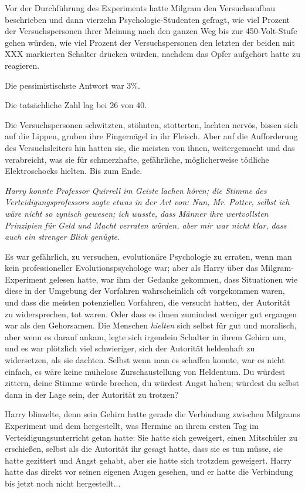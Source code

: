 {Vor der Durchführung des Experiments hatte Milgram den Versuchsaufbau beschrieben und dann vierzehn Psychologie-Studenten gefragt, wie viel Prozent der Versuchspersonen ihrer Meinung nach den ganzen Weg bis zur 450-Volt-Stufe gehen würden, wie viel Prozent der Versuchspersonen den letzten der beiden mit XXX markierten Schalter drücken würden, nachdem das Opfer aufgehört hatte zu reagieren.

Die pessimistischste Antwort war 3\%.

Die tatsächliche Zahl lag bei 26 von 40.

Die Versuchspersonen schwitzten, stöhnten, stotterten, lachten nervös, bissen sich auf die Lippen, gruben ihre Fingernägel in ihr Fleisch. Aber auf die Aufforderung des Versuchsleiters hin hatten sie, die meisten von ihnen, weitergemacht und das verabreicht, was sie für schmerzhafte, gefährliche, möglicherweise tödliche Elektroschocks hielten. Bis zum Ende.

\emph{Harry konnte Professor Quirrell im Geiste lachen hören; die Stimme des Verteidigungsprofessors sagte etwas in der Art von: \emph{Nun, Mr. Potter, selbst ich wäre} \emph{nicht so zynisch gewesen; ich wusste, dass Männer ihre wertvollsten Prinzipien für Geld und Macht verraten würden, aber mir war nicht klar, dass auch ein strenger Blick genügte.}}

Es war gefährlich, zu versuchen, evolutionäre Psychologie zu erraten, wenn man kein professioneller Evolutionspsychologe war; aber als Harry über das Milgram-Experiment gelesen hatte, war ihm der Gedanke gekommen, dass Situationen wie diese in der Umgebung der Vorfahren wahrscheinlich oft vorgekommen waren, und dass die meisten potenziellen Vorfahren, die versucht hatten, der Autorität zu widersprechen, tot waren. Oder dass es ihnen zumindest weniger gut ergangen war als den Gehorsamen. Die Menschen \emph{hielten} sich selbst für gut und moralisch, aber wenn es darauf ankam, legte sich irgendein Schalter in ihrem Gehirn um, und es war plötzlich viel schwieriger, sich der Autorität heldenhaft zu widersetzen, als sie dachten. Selbst wenn man es schaffen konnte, war es nicht einfach, es wäre keine mühelose Zurschaustellung von Heldentum. Du würdest zittern, deine Stimme würde brechen, du würdest Angst haben; würdest du selbst dann in der Lage sein, der Autorität zu trotzen?

Harry blinzelte, denn sein Gehirn hatte gerade die Verbindung zwischen Milgrams Experiment und dem hergestellt, was Hermine an ihrem ersten Tag im Verteidigungsunterricht getan hatte: Sie hatte sich geweigert, einen Mitschüler zu erschießen, selbst als die Autorität ihr gesagt hatte, dass sie es tun müsse, sie hatte gezittert und Angst gehabt, aber sie hatte sich trotzdem geweigert. Harry hatte das direkt vor seinen eigenen Augen gesehen, und er hatte die Verbindung bis jetzt noch nicht hergestellt...

}
